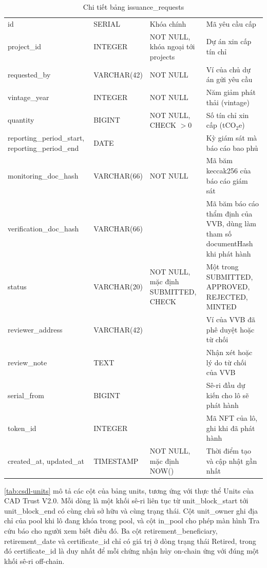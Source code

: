 \begin{table}[!htbp]
    \centering
    \caption{Chi tiết bảng issuance\_requests}
    \label{tab:csdl-yeucau}
    \small
    \begin{tabularx}{\textwidth}{|L{3.9cm}|L{2.85cm}|L{2.6cm}|Y|}
        \hline
         &  &  &  \\
        \hline
        id & SERIAL & Khóa chính & Mã yêu cầu cấp \\
        \hline
        project\_id & INTEGER & NOT NULL, khóa ngoại tới projects & Dự án xin cấp tín chỉ \\
        \hline
        requested\_by & VARCHAR(42) & NOT NULL & Ví của chủ dự án gửi yêu cầu \\
        \hline
        vintage\_year & INTEGER & NOT NULL & Năm giảm phát thải (vintage) \\
        \hline
        quantity & BIGINT & NOT NULL, CHECK $> 0$ & Số tín chỉ xin cấp (tCO$_2$e) \\
        \hline
        reporting\_period\_start, reporting\_period\_end & DATE & & Kỳ giám sát mà báo cáo bao phủ \\
        \hline
        monitoring\_doc\_hash & VARCHAR(66) & NOT NULL & Mã băm keccak256 của báo cáo giám sát \\
        \hline
        verification\_doc\_hash & VARCHAR(66) & & Mã băm báo cáo thẩm định của VVB, dùng làm tham số documentHash khi phát hành \\
        \hline
        status & VARCHAR(20) & NOT NULL, mặc định SUBMITTED, CHECK & Một trong SUBMITTED, APPROVED, REJECTED, MINTED \\
        \hline
        reviewer\_address & VARCHAR(42) & & Ví của VVB đã phê duyệt hoặc từ chối \\
        \hline
        review\_note & TEXT & & Nhận xét hoặc lý do từ chối của VVB \\
        \hline
        serial\_from & BIGINT & & Sê-ri đầu dự kiến cho lô sẽ phát hành \\
        \hline
        token\_id & INTEGER & & Mã NFT của lô, ghi khi đã phát hành \\
        \hline
        created\_at, updated\_at & TIMESTAMP & NOT NULL, mặc định NOW() & Thời điểm tạo và cập nhật gần nhất \\
        \hline
    \end{tabularx}
\end{table}

\autoref{tab:csdl-units} mô tả các cột của bảng units, tương ứng với thực thể Units của CAD Trust V2.0. Mỗi dòng là một khối sê-ri liên tục từ unit\_block\_start tới unit\_block\_end có cùng chủ sở hữu và cùng trạng thái. Cột unit\_owner ghi địa chỉ của pool khi lô đang khóa trong pool, và cột in\_pool cho phép màn hình Tra cứu báo cho người xem biết điều đó. Ba cột retirement\_beneficiary, retirement\_date và certificate\_id chỉ có giá trị ở dòng trạng thái Retired, trong đó certificate\_id là duy nhất để mỗi chứng nhận hủy on-chain ứng với đúng một khối sê-ri off-chain.

